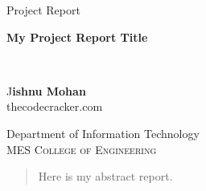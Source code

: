 \documentclass[12pt,a4paper]{report}
\begin{document}
\fancypage{\setlength{\fboxsep}{10pt}\doublebox}{}
\renewcommand\bibname{References} 


\begin{titlepage}
\begin{center}
\textup{\large Project Report}\\[1.0cm]

\begin{LARGE}{\textbf {My Project Report Title}}\end{LARGE}\\[3.0cm]

\vfill
\begin{large}J\textbf{ishnu Mohan}\\thecodecracker.com \\\end{large}
\vfill

\LARGE{Department of Information Technology}\\
\normalsize
\textsc{MES College of Engineering}\\
\vspace{0.5cm}
\end{center}
\end{titlepage}

\begin{abstract}
Here is my abstract report.
\end{abstract}

\newpage
\tableofcontents
\listoffigures

\newpage
\end{document}
